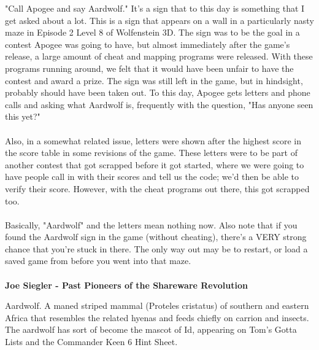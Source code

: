 \begin{fancyquotes}
"Call Apogee and say Aardwolf."  It's a sign that to this day is something
that I get asked about a lot.  This is a sign that appears on a wall in a
particularly nasty maze in Episode 2 Level 8 of Wolfenstein 3D.  The sign
was to be the goal in a contest Apogee was going to have, but almost
immediately after the game's release, a large amount of cheat and mapping
programs were released.  With these programs running around, we felt that
it would have been unfair to have the contest and award a prize.  The sign
was still left in the game, but in hindsight, probably should have been
taken out.  To this day, Apogee gets letters and phone calls and asking
what Aardwolf is, frequently with the question, "Has anyone seen this yet?"\\
\\
Also, in a somewhat related issue, letters were shown after the highest score
in the score table in some revisions of the game.  These letters were to be
part of another contest that got scrapped before it got started, where we were
going to have people call in with their scores and tell us the code; we'd then
be able to verify their score.  However, with the cheat programs out there,
this got scrapped too.\\
\\
Basically, "Aardwolf" and the letters mean nothing now.  Also note that if
you found the Aardwolf sign in the game (without cheating), there's a VERY
strong chance that you're stuck in there.  The only way out may be to restart,
or load a saved game from before you went into that maze.\\
\\
\textbf{Joe Siegler - Past Pioneers of the Shareware Revolution}
\end{fancyquotes}
\par
Aardwolf. A maned striped mammal (Proteles cristatus) of southern and eastern
Africa that resembles the related hyenas and feeds chiefly on carrion and insects.
The aardwolf has sort of become the mascot of Id, appearing on Tom's Gotta
Lists and the Commander Keen 6 Hint Sheet.














 
 
 
 

